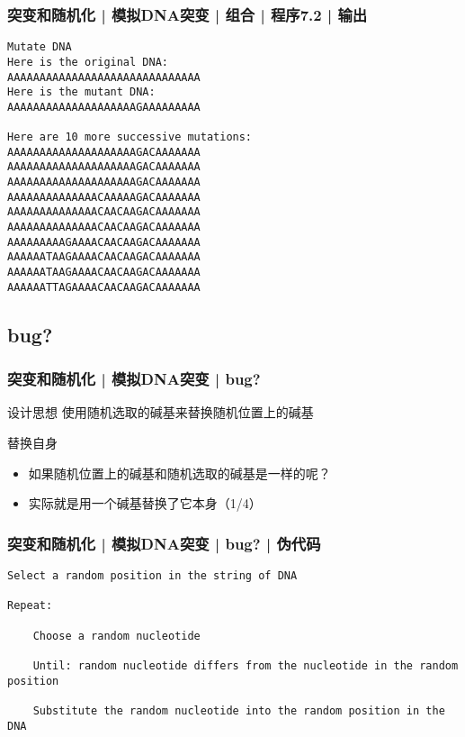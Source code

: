 \begin{frame}[fragile]
  \frametitle{突变和随机化 | 模拟DNA突变 | 组合 | 程序7.2 | 输出}
  \vspace{-1.5em}
\begin{lstlisting}[basicstyle=\small\tt,numberstyle=\footnotesize]
Mutate DNA
Here is the original DNA:
AAAAAAAAAAAAAAAAAAAAAAAAAAAAAA
Here is the mutant DNA:
AAAAAAAAAAAAAAAAAAAAGAAAAAAAAA

Here are 10 more successive mutations:
AAAAAAAAAAAAAAAAAAAAGACAAAAAAA
AAAAAAAAAAAAAAAAAAAAGACAAAAAAA
AAAAAAAAAAAAAAAAAAAAGACAAAAAAA
AAAAAAAAAAAAAACAAAAAGACAAAAAAA
AAAAAAAAAAAAAACAACAAGACAAAAAAA
AAAAAAAAAAAAAACAACAAGACAAAAAAA
AAAAAAAAAGAAAACAACAAGACAAAAAAA
AAAAAATAAGAAAACAACAAGACAAAAAAA
AAAAAATAAGAAAACAACAAGACAAAAAAA
AAAAAATTAGAAAACAACAAGACAAAAAAA
\end{lstlisting}
\end{frame}

\subsection{bug?}
\begin{frame}
  \frametitle{突变和随机化 | 模拟DNA突变 | bug?}
  \begin{block}{设计思想}
    使用随机选取的碱基来替换随机位置上的碱基
  \end{block}
  \pause
  \begin{block}{替换自身}
    \begin{itemize}
      \item 如果随机位置上的碱基和随机选取的碱基是一样的呢？
      \item 实际就是用一个碱基替换了它本身（1/4）
    \end{itemize}
  \end{block}
\end{frame}

\begin{frame}[fragile]
  \frametitle{突变和随机化 | 模拟DNA突变 | bug? | 伪代码}
  \vspace{-1.5em}
\begin{lstlisting}
Select a random position in the string of DNA

Repeat:

    Choose a random nucleotide

    Until: random nucleotide differs from the nucleotide in the random position

    Substitute the random nucleotide into the random position in the DNA
\end{lstlisting}
\end{frame}

